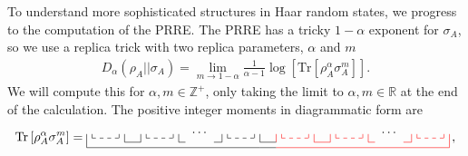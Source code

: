 \documentclass[a4paper,11pt]{article}
\newcommand{\Tr}{\text{Tr}}
\begin{document}
To understand more sophisticated structures in Haar random states, we progress to the computation of the PRRE. The PRRE has a tricky $1-\alpha$ exponent for $\sigma_A$, so we use a replica trick with two replica parameters, $\alpha$ and $m$
\begin{align}
    D_{\alpha}(\rho_A|| \sigma_A) = \lim_{m\rightarrow 1-\alpha}\frac{1}{\alpha - 1}\log\left[ \Tr \left[ \rho_A^{\alpha} \sigma_A^{m}\right]\right].
\end{align}
We will compute this for $\alpha, m \in \mathbb{Z}^+$, only taking the limit to $\alpha, m \in \mathbb{R}$ at the end of the calculation.
The positive integer moments in diagrammatic form are
\begin{align}
    \Tr \left[ \rho_A^{\alpha} \sigma_A^{m}\right] = 
    \tikz[scale=0.75,baseline=-0.5ex]{
    \draw[dashed] (0,0) -- (1,0);
    \draw (0,0)-- (0,.15);
    \draw (1,0)-- (1,.15);
    \draw (-0.2,0.15)-- (-0.2,-0.35);
    \draw (1.2,-0.15)-- (1.2,0.15);
    \draw[dashed,black] (2,0) -- (3,0);
    \draw[black] (2,0)-- (2,0.15);
    \draw[black] (3,0)-- (3,0.15);
    \draw[black] (1.8,-.15)-- (1.8,0.15);
    \draw[black] (3.2,-0.15)-- (3.2,0.15);
    \draw[dashed,black] (5,0) -- (6,0);
    \draw[black] (5,0)-- (5,0.15);
    \draw[black] (6,0)-- (6,0.15);
    \draw[black] (4.8,0.15)-- (4.8,-0.15);
    \draw[black] (6.2,-0.15)-- (6.2,0.15);
    \draw[red,dashed] (7+0,0) -- (7+1,0);
    \draw[red] (7+0,0)-- (7+0,.15);
    \draw[red] (7+1,0)-- (7+1,.15);
    \draw[red] (7-0.2,0.15)-- (7-0.2,-0.15);
    \draw[red] (7+1.2,-0.15)-- (7+1.2,0.15);
    \draw[dashed,red] (7+2,0) -- (7+3,0);
    \draw[red] (7+2,0)-- (7+2,0.15);
    \draw[red] (7+3,0)-- (7+3,0.15);
    \draw[red] (7+1.8,-.15)-- (7+1.8,0.15);
    \draw[red] (7+3.2,-0.15)-- (7+3.2,0.15);
    \draw[dashed,red] (7+5,0) -- (7+6,0);
    \draw[red] (7+5,0)-- (7+5,0.15);
    \draw[red] (7+6,0)-- (7+6,0.15);
    \draw[red] (7+4.8,0.15)-- (7+4.8,-0.15);
    \draw[red] (7+6.2,-0.35)-- (7+6.2,0.15);
    \draw (1.2,-0.15)--(1.8,-0.15);
    \draw[black] (3.2,-0.15)--(3.45,-0.15);
    \draw (-0.2,-0.35)-- (6.2,-0.35);
    \draw[black] (4.5,-0.15)--(4.8,-0.15);
    \node[] at (4.,0.2) {$\cdots$};
    \draw[black] (7-2+1.2,-0.15)--(7-2+1.8,-0.15);
    \draw[black] (7-2+1.2,-0.35)--(7-2+1.8,-0.35);
    \draw[red] (7+1.2,-0.15)--(7+1.8,-0.15);
    \draw[red] (7+3.2,-0.15)--(7+3.45,-0.15);
    \draw[red] (7-0.2,-0.35)-- (7+6.2,-0.35);
    \draw[red] (7+4.5,-0.15)--(7+4.8,-0.15);
    \node[] at (7+4.,0.2) {$\cdots$};
    } \, ,
\end{align}
\end{document}
